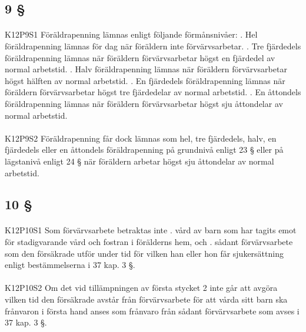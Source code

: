 \documentclass[a4paper,notitlepage,openany,10pt]{book}
\begin{document}
\subsection*{9 §}
\paragraph*{}
{\tiny K12P9S1}
Föräldrapenning lämnas enligt följande förmånsnivåer:
. Hel föräldrapenning lämnas för dag när föräldern inte förvärvsarbetar.
. Tre fjärdedels föräldrapenning lämnas när föräldern förvärvsarbetar högst en fjärdedel av normal arbetstid.
. Halv föräldrapenning lämnas när föräldern förvärvsarbetar högst hälften av normal arbetstid.
. En fjärdedels föräldrapenning lämnas när föräldern förvärvsarbetar högst tre fjärdedelar av normal arbetstid.
. En åttondels föräldrapenning lämnas när föräldern förvärvsarbetar högst sju åttondelar av normal arbetstid.
\paragraph*{}
{\tiny K12P9S2}
Föräldrapenning får dock lämnas som hel, tre fjärdedels, halv, en fjärdedels eller en åttondels föräldrapenning på grundnivå enligt 23 § eller på lägstanivå enligt 24 § när föräldern arbetar högst sju åttondelar av normal arbetstid.
\subsection*{10 §}
\paragraph*{}
{\tiny K12P10S1}
Som förvärvsarbete betraktas inte
. vård av barn som har tagits emot för stadigvarande vård och fostran i förälderns hem, och
. sådant förvärvsarbete som den försäkrade utför under tid för vilken han eller hon får sjukersättning enligt bestämmelserna i 37 kap. 3 §.
\paragraph*{}
{\tiny K12P10S2}
Om det vid tillämpningen av första stycket 2 inte går att avgöra vilken tid den försäkrade avstår från förvärvsarbete för att vårda sitt barn ska frånvaron i första hand anses som frånvaro från sådant förvärvsarbete som avses i 37 kap. 3 §.
\end{document}
